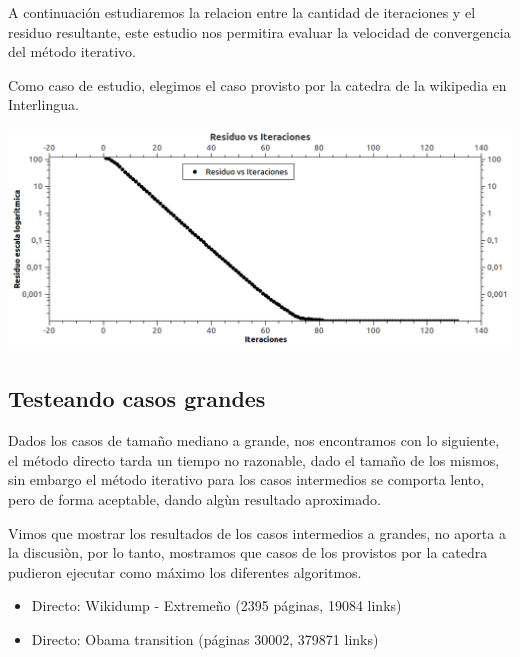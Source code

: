 A continuación estudiaremos la relacion entre la cantidad de iteraciones y el residuo resultante, este estudio nos permitira evaluar la velocidad de convergencia del método iterativo.

Como caso de estudio, elegimos el caso provisto por la catedra de la wikipedia en Interlingua.

\begin{center}
  \centering
  \includegraphics[scale=0.6]{../graficos/residuo_vs_iteraciones.png}

  \label{fig: Iteraciones vs Residuo}
\end{center}

\subsection{Testeando casos grandes}

Dados los casos de tamaño mediano a grande, nos encontramos con lo siguiente, el método directo tarda un tiempo no razonable, dado el tamaño de los mismos, sin embargo el método iterativo para los casos intermedios se comporta lento, pero de forma aceptable, dando algùn resultado aproximado. 

Vimos que mostrar los resultados de los casos intermedios a grandes, no aporta a la discusiòn, por lo tanto, mostramos que casos de los provistos por la catedra pudieron ejecutar como máximo los diferentes algoritmos.

\begin{itemize}
 \item Directo: Wikidump - Extremeño (2395 páginas, 19084 links)
 \item Directo: Obama transition (páginas 30002, 379871 links)
\end{itemize}

